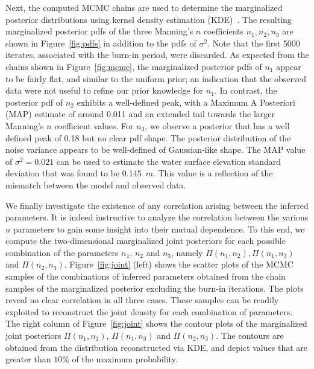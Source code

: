 Next, the computed MCMC chains are used to determine the marginalized posterior 
distributions using kernel density estimation (KDE)~\citep{Parzen1962,Silverman1986}.  
The resulting marginalized posterior pdfs of the three Manning's $n$ coefficients 
$n_1,n_2,n_3$ are shown in Figure~\ref{fig:pdfs} in addition to the pdfs of $\sigma^2$. 
Note that the first 5000 iterates, associated with the burn-in period, were discarded.  
As expected from the chains shown in Figure~\ref{fig:mcmc}, the marginalized posterior 
pdfs of $n_1$ appear to be fairly flat, and similar to the uniform prior; an indication 
that the observed data were not useful to refine our prior knowledge for $n_1$. In 
contrast, the posterior pdf of $n_2$ exhibits a well-defined peak, with a Maximum A 
Posteriori (MAP) estimate of around 0.011 and an extended tail towards the larger 
Manning's $n$ coefficient values. For $n_3$, we observe a posterior that has a well 
defined peak of 0.18 but no clear pdf shape. The posterior distribution of the noise variance 
appears to be well-defined of Gaussian-like shape. The MAP value of $\sigma^2=0.021$ 
can be used to estimate the water surface elevation standard deviation that was found to 
be 0.145~$m$. This value is a reflection of the mismatch between the model and 
observed data.

We finally investigate the existence of any correlation arising between the inferred parameters.
It is indeed instructive to analyze the 
correlation between the various $n$ parameters to gain some insight into their mutual dependence.
To this end, we compute the two-dimensional marginalized joint posteriors for each 
possible combination of the parameters $n_1$, $n_2$ and $n_3$, namely $\Pi(n_1, n_2), \Pi(n_1, n_3)$ and $\Pi(n_2, n_3)$. Figure~\ref{fig:joint} (left) shows the scatter plots of the MCMC samples of the combinations of 
inferred parameters obtained from the chain samples of the marginalized posterior excluding 
the burn-in iterations. The plots reveal no clear correlation in all three cases. 
These samples can be readily exploited to reconstruct the joint density for each combination of parameters. 
The right column of Figure~\ref{fig:joint} shows the contour plots of the marginalized joint posteriors 
$\Pi(n_1, n_2)$, $\Pi(n_1, n_3)$ and $\Pi(n_2, n_3)$. The contours are obtained from the
distribution reconstructed via KDE, and depict values that are greater than $10\%$
of the maximum probability.

